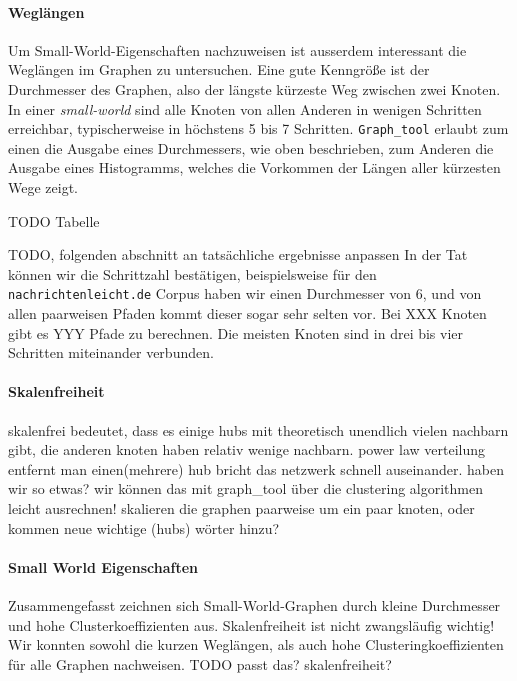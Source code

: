 \documentclass[12pt, a4paper]{article}
\begin{document}

\paragraph{Wegl\"angen}
Um Small-World-Eigenschaften nachzuweisen ist ausserdem interessant die
Weglängen im Graphen zu untersuchen. Eine gute Kenngröße ist der Durchmesser
des Graphen, also der längste kürzeste Weg zwischen zwei Knoten. In einer
\emph{small-world} sind alle Knoten von allen Anderen in wenigen Schritten
erreichbar, typischerweise in höchstens 5 bis 7 Schritten. \texttt{Graph\_tool}
erlaubt zum einen die Ausgabe eines Durchmessers, wie oben beschrieben, zum
Anderen die Ausgabe eines Histogramms, welches die Vorkommen der Längen aller
kürzesten Wege zeigt.

TODO Tabelle

TODO, folgenden abschnitt an tatsächliche ergebnisse anpassen In der Tat können
wir die Schrittzahl bestätigen, beispielsweise für den
\texttt{nachrichtenleicht.de} Corpus haben wir einen Durchmesser von 6, und von
allen paarweisen Pfaden kommt dieser sogar sehr selten vor. Bei XXX Knoten gibt
es YYY Pfade zu berechnen. Die meisten Knoten sind in drei bis vier Schritten
miteinander verbunden.

                             
\paragraph{Skalenfreiheit}
skalenfrei bedeutet, dass es einige hubs mit theoretisch unendlich vielen
nachbarn gibt, die anderen knoten haben relativ wenige nachbarn. power law
verteilung entfernt man einen(mehrere) hub bricht das netzwerk schnell
auseinander. haben wir so etwas? wir können das mit graph\_tool über die
clustering algorithmen leicht ausrechnen!  skalieren die graphen paarweise um
ein paar knoten, oder kommen neue wichtige (hubs) wörter hinzu?

\paragraph{Small World Eigenschaften}
Zusammengefasst zeichnen sich Small-World-Graphen durch kleine Durchmesser und
hohe Clusterkoeffizienten aus. Skalenfreiheit ist nicht zwangsläufig wichtig!
Wir konnten sowohl die kurzen Weglängen, als auch hohe Clusteringkoeffizienten
für alle Graphen nachweisen. TODO passt das? skalenfreiheit? 
\end{document}
